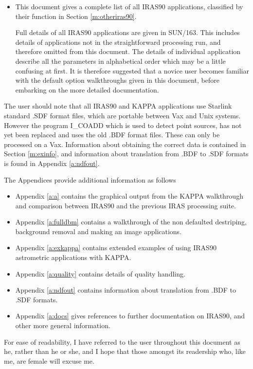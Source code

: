 \documentclass[twoside,11pt]{article}
\newcommand{\xref}[3]{#1}
\begin{document}
\begin{itemize}
\item This document gives a complete list of all IRAS90 applications, classified
by their function in Section \ref{m:otheriras90}. 

Full details of all IRAS90 applications are given in
\xref{SUN/163}{sun163}{}. This includes
details of applications not in the straightforward processing run, and
therefore omitted from this document. The details of individual application
describe all the parameters in alphabetical order which may be a little
confusing at first. It is therefore suggested that a novice user becomes
familiar with the default option walkthroughs given in this document, before
embarking on the more detailed documentation.
\end{itemize}

The user should note that all IRAS90 and KAPPA applications use Starlink
standard .SDF format files, which are portable between Vax and Unix systems.
However the program I\_COADD which is used to detect point sources, has not
yet been replaced and uses the old .BDF format files. These can only be
processed on a Vax. Information about obtaining the correct data is contained
in Section \ref{m:exinfo}, and information about translation from .BDF to .SDF
formats is found in Appendix \ref{a:ndfout}.

The Appendices provide additional information as follows
\begin{itemize}
\item Appendix \ref{a:a} contains the graphical output from the KAPPA
walkthrough and comparison between IRAS90 and the previous IRAS processing
suite.
\item Appendix \ref{a:fulldbm} contains a walkthrough of the non defaulted
destriping, background removal and making an image applications.
\item Appendix \ref{a:exkappa} contains extended examples of using IRAS90
astrometric applications with KAPPA.
\item Appendix \ref{a:quality} contains details of quality handling.
\item Appendix \ref{a:ndfout} contains information about translation from
.BDF to .SDF formats.
\item Appendix \ref{a:docs} gives references to further documentation on IRAS90,
and other more general information.
\end{itemize}

For ease of readability, I have referred to the user throughout this document  
as he, rather than he or she, and I hope that those amongst its readership 
who, like me, are female will excuse me.
\end{document}
